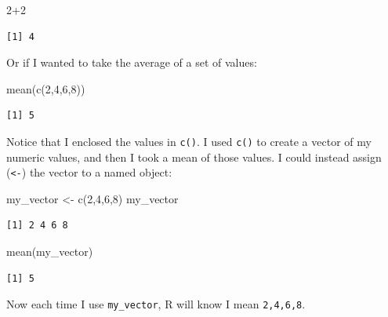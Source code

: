 \documentclass[
  letterpaper,
  DIV=11,
  numbers=noendperiod]{scrreprt}
\newenvironment{Shaded}{\begin{snugshade}}{\end{snugshade}}
\newcommand{\DecValTok}[1]{\textcolor[rgb]{0.68,0.00,0.00}{#1}}
\newcommand{\FunctionTok}[1]{\textcolor[rgb]{0.28,0.35,0.67}{#1}}
\newcommand{\NormalTok}[1]{\textcolor[rgb]{0.00,0.23,0.31}{#1}}
\newcommand{\OtherTok}[1]{\textcolor[rgb]{0.00,0.23,0.31}{#1}}
\newcommand{\SpecialCharTok}[1]{\textcolor[rgb]{0.37,0.37,0.37}{#1}}
\begin{document}
\begin{Shaded}
\begin{Highlighting}[]
\DecValTok{2}\SpecialCharTok{+}\DecValTok{2}
\end{Highlighting}
\end{Shaded}

\begin{verbatim}
[1] 4
\end{verbatim}

Or if I wanted to take the average of a set of values:

\begin{Shaded}
\begin{Highlighting}[]
\FunctionTok{mean}\NormalTok{(}\FunctionTok{c}\NormalTok{(}\DecValTok{2}\NormalTok{,}\DecValTok{4}\NormalTok{,}\DecValTok{6}\NormalTok{,}\DecValTok{8}\NormalTok{))}
\end{Highlighting}
\end{Shaded}

\begin{verbatim}
[1] 5
\end{verbatim}

Notice that I enclosed the values in \texttt{c()}. I used \texttt{c()}
to create a vector of my numeric values, and then I took a mean of those
values. I could instead assign (\texttt{\textless{}-}) the vector to a
named object:

\begin{Shaded}
\begin{Highlighting}[]
\NormalTok{my\_vector }\OtherTok{\textless{}{-}} \FunctionTok{c}\NormalTok{(}\DecValTok{2}\NormalTok{,}\DecValTok{4}\NormalTok{,}\DecValTok{6}\NormalTok{,}\DecValTok{8}\NormalTok{)}
\NormalTok{my\_vector}
\end{Highlighting}
\end{Shaded}

\begin{verbatim}
[1] 2 4 6 8
\end{verbatim}

\begin{Shaded}
\begin{Highlighting}[]
\FunctionTok{mean}\NormalTok{(my\_vector)}
\end{Highlighting}
\end{Shaded}

\begin{verbatim}
[1] 5
\end{verbatim}

Now each time I use \texttt{my\_vector}, R will know I mean
\texttt{2,4,6,8}.
\end{document}
